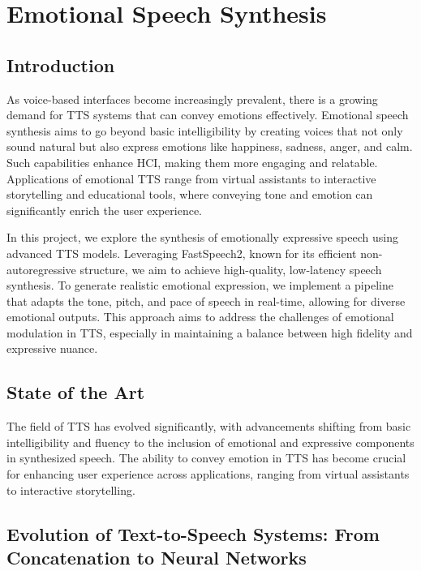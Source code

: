\section{Emotional Speech Synthesis}

\subsection{Introduction}

As voice-based interfaces become increasingly prevalent, there is a growing demand for TTS systems that can convey emotions effectively. Emotional speech synthesis aims to go beyond basic intelligibility by creating voices that not only sound natural but also express emotions like happiness, sadness, anger, and calm. Such capabilities enhance HCI, making them more engaging and relatable. Applications of emotional TTS range from virtual assistants to interactive storytelling and educational tools, where conveying tone and emotion can significantly enrich the user experience.

In this project, we explore the synthesis of emotionally expressive speech using advanced TTS models. Leveraging FastSpeech2, known for its efficient non-autoregressive structure, we aim to achieve high-quality, low-latency speech synthesis. To generate realistic emotional expression, we implement a pipeline that adapts the tone, pitch, and pace of speech in real-time, allowing for diverse emotional outputs. This approach aims to address the challenges of emotional modulation in TTS, especially in maintaining a balance between high fidelity and expressive nuance.

\subsection{State of the Art}

The field of TTS has evolved significantly, with advancements shifting from basic intelligibility and fluency to the inclusion of emotional and expressive components in synthesized speech. The ability to convey emotion in TTS has become crucial for enhancing user experience across applications, ranging from virtual assistants to interactive storytelling.

\subsection{Evolution of Text-to-Speech Systems: From Concatenation to Neural Networks}

